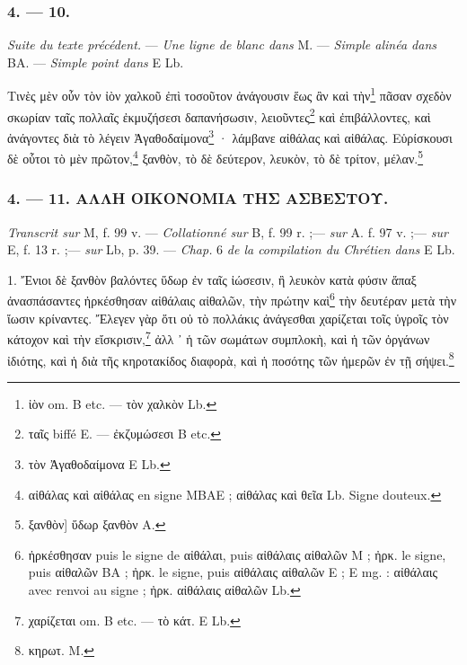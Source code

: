 \documentclass[a4paper, 11pt, oneside, polutonikogreek, french]{article}
\begin{document}
\bigskip
\centerline{\EightStarTaper}
\centerline{\EightStarTaper\EightStarTaper}
\bigskip

\subsubsection{4. --- 10.}

\emph{Suite du texte précédent.} --- \emph{Une ligne de blanc dans} M. --- \emph{Simple alinéa dans} BA. --- \emph{Simple point dans} E Lb.

\bigskip

Τινὲς μὲν οὖν τὸν ἰὸν χαλκοῦ ἐπὶ τοσοῦτον ἀνάγουσιν ἕως ἂν καὶ τὴν\footnote{ἰὸν om. B etc. --- τὸν χαλκὸν Lb.} πᾶσαν σχεδὸν σκωρίαν ταῖς πολλαῖς ἐκμυζήσεσι δαπανήσωσιν, λειοῦντες\footnote{ταῖς biffé E. --- ἐκζυμώσεσι B etc.} καὶ ἐπιβάλλοντες, καὶ ἀνάγοντες διὰ τὸ λέγειν Ἀγαθοδαίμονα\footnote{τὸν Ἀγαθοδαίμονα E Lb.} · λάμβανε αἰθάλας καὶ αἰθάλας. Εὑρίσκουσι δὲ οὗτοι τὸ μὲν πρῶτον,\footnote{αἰθάλας καὶ αἰθάλας en signe MBAE ; αἰθάλας καὶ θεῖα Lb. Signe douteux.} ξανθὸν, τὸ δὲ δεύτερον, λευκὸν, τὸ δὲ τρίτον, μέλαν.\footnote{ξανθὸν] ὕδωρ ξανθὸν A.}

\bigskip
\centerline{\EightStarTaper}
\centerline{\EightStarTaper\EightStarTaper}
\bigskip

\subsubsection{4. --- 11. ΑΛΛΗ ΟΙΚΟΝΟΜΙΑ ΤΗΣ ΑΣΒΕΣΤΟΥ.}

\emph{Transcrit sur} M, f. 99 v. --- \emph{Collationné sur} B, f. 99 r. ;--- \emph{sur} A. f. 97 v. ;--- \emph{sur} E, f. 13 r. ;--- \emph{sur} Lb, p. 39. --- \emph{Chap.} 6 \emph{de la compilation du Chrétien dans} E Lb.

\bigskip

1. Ἔνιοι δὲ ξανθὸν βαλόντες ὕδωρ ἐν ταῖς ἰώσεσιν, ἢ λευκὸν κατὰ φύσιν ἅπαξ ἀνασπάσαντες ἠρκέσθησαν αἰθάλαις αἰθαλῶν, τὴν πρώτην καὶ\footnote{ἠρκέσθησαν puis le signe de αἰθάλαι, puis αἰθάλαις αἰθαλῶν M ; ἠρκ. le signe, puis αἰθαλῶν BA ; ἠρκ. le signe, puis αἰθάλαις αἰθαλῶν E ; E mg. : αἰθάλαις avec renvoi au signe ; ἠρκ. αἰθάλαις αἰθαλῶν Lb.} τὴν δευτέραν μετὰ τὴν ἴωσιν κρίναντες. Ἔλεγεν γὰρ ὅτι οὐ τὸ πολλάκις ἀνάγεσθαι χαρίζεται τοῖς ὑγροῖς τὸν κάτοχον καὶ τὴν εἴσκρισιν,\footnote{χαρίζεται om. B etc. --- τὸ κάτ. E Lb.} ἀλλ ᾽ ἡ τῶν σωμάτων συμπλοκὴ, καὶ ἡ τῶν ὀργάνων ἰδιότης, καὶ ἡ διὰ τῆς κηροτακίδος διαφορὰ, καὶ ἡ ποσότης τῶν ἡμερῶν ἐν τῇ σήψει.\footnote{κηρωτ. M.}
\end{document}
